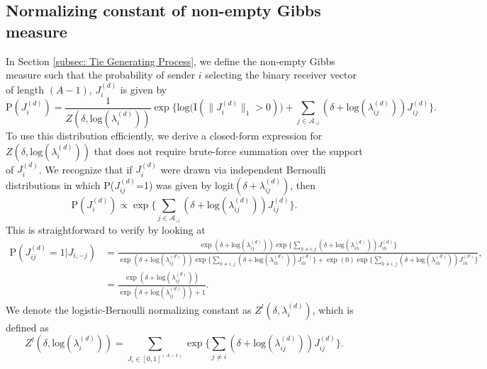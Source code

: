 \documentclass[a4paper]{article}
\begin{document}
   	 \subsection{Normalizing constant of non-empty Gibbs measure}\label{subsec: non-empty Gibbs measure}
  	 In Section \ref{subsec: Tie Generating Process}, we define the non-empty Gibbs measure such that 
 the probability of sender $i$ selecting the binary receiver vector of length $(A-1)$, $J_i^{(d)}$ is given by
  	 \begin{equation*} \text{P}(J_i^{(d)}) = \frac{1}{Z(\delta,\mbox{log}(\lambda_i^{(d)}))} \exp\Big\{ \mbox{log}\big(\text{I}(\lVert J_i^{(d)} \rVert_1 > 0)\big) + \sum_{j \in \mathcal{A}_{\backslash i}} (\delta+\mbox{log}(\lambda_{ij}^{(d)}))J_{ij}^{(d)} \Big\}.
  	 \end{equation*}
  	 	 To use this distribution efficiently, we derive a closed-form expression for $Z(\delta,\mbox{log}(\lambda_{i}^{(d)}))$ that does not require brute-force summation over the support of $J_i^{(d)}$. We recognize that if $J_i^{(d)}$ were drawn via independent Bernoulli distributions in which P($J_{ij}^{(d)}$=1) was given by logit$(\delta+\lambda_{ij}^{(d)})$, then \begin{equation*}\text{P}(J_i^{(d)}) \propto \exp\Big\{  \sum_{j \in \mathcal{A}_{\backslash i}} (\delta+\mbox{log}(\lambda_{ij}^{(d)}))J_{ij}^{(d)}\Big\}.  	 \end{equation*}
  	 	  This is straightforward to verify by looking at 
  	 	  \begin{equation*}
  	 	  \begin{aligned}\text{P}(J_{ij}^{(d)}=1|J_{i,-j})&=\frac{ \exp{(\delta+\mbox{log}(\lambda_{ij}^{(d)}))}\exp\Big\{ \sum_{h\neq i,j} (\delta+\mbox{log}(\lambda_{ih}^{(d)}))J_{ih}^{(d)} \Big\}}{\exp{(\delta+\mbox{log}(\lambda_{ij}^{(d)}))}\exp\Big\{   \sum_{h\neq i,j} (\delta+\mbox{log}(\lambda_{ih}^{(d)}))J_{ih}^{(d)} \Big\}+ \exp{(0)}\exp\Big\{ \sum_{h\neq i,j} (\delta+\mbox{log}(\lambda_{ih}^{(d)}))J_{ih}^{(d)} \Big\}},\\
  	 	  &=\frac{ \exp{(\delta+\mbox{log}(\lambda_{ij}^{(d)}))}}{\exp{(\delta+\mbox{log}(\lambda_{ij}^{(d)}))} + 1}.\end{aligned}\end{equation*}
  	 	  We denote the logistic-Bernoulli normalizing constant as $Z^{l}(\delta,\lambda_i^{(d)})$, which is defined as 
  	 	  \begin{equation*}
  	 	  Z^{l}(\delta,\mbox{log}(\lambda_{i}^{(d)}))=\sum_{J_i \in [0,1]^{(A-1)}} \exp\Big\{\sum_{j\neq i} (\delta+\mbox{log}(\lambda_{ij}^{(d)}))J_{ij}^{(d)} \Big\}.
  	 	  \end{equation*}
  	 
\end{document}
